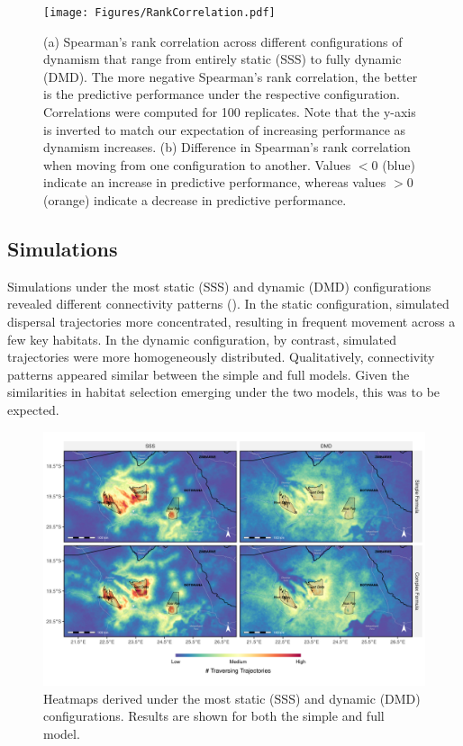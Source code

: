 \documentclass[abstract=on,10pt,a4paper,bibliography=totocnumbered]{article}
\begin{document}
\begin{figure}
 \begin{center}
  \texttt{[image: Figures/RankCorrelation.pdf]}
  \caption{(a) Spearman's rank correlation across different configurations of
  dynamism that range from entirely static (SSS) to fully dynamic (DMD). The
  more negative Spearman's rank correlation, the better is the predictive
  performance under the respective configuration. Correlations were computed for
  100 replicates. Note that the y-axis is inverted to match our expectation of
  increasing performance as dynamism increases. (b) Difference in Spearman's
  rank correlation when moving from one configuration to another. Values $< 0$
  (blue) indicate an increase in predictive performance, whereas values $> 0$
  (orange) indicate a decrease in predictive performance.}
  \label{RankCorrelation}
 \end{center}
\end{figure}

\subsection{Simulations}

Simulations under the most static (SSS) and dynamic (DMD) configurations
revealed different connectivity patterns (). In the
static configuration, simulated dispersal trajectories more concentrated,
resulting in frequent movement across a few key habitats. In the dynamic
configuration, by contrast, simulated trajectories were more homogeneously
distributed. Qualitatively, connectivity patterns appeared similar between the
simple and full models. Given the similarities in habitat selection emerging
under the two models, this was to be expected.

\begin{figure}
 \begin{center}
  \includegraphics[width = \textwidth]{Figures/HeatmapComparison}
  \caption{Heatmaps derived under the most static (SSS) and dynamic (DMD)
  configurations. Results are shown for both the simple and full model.}
  \label{HeatmapComparison}
 \end{center}
\end{figure}
\end{document}
